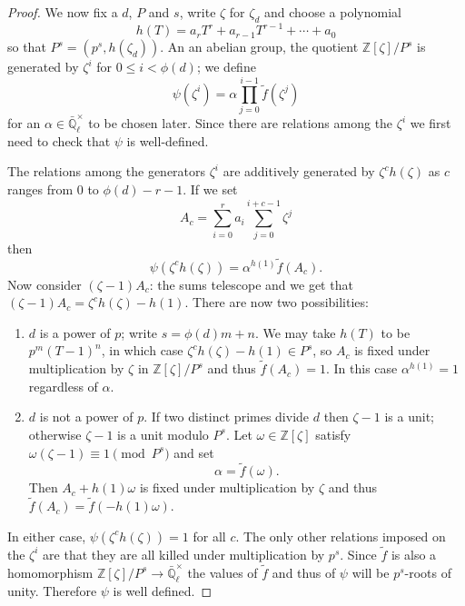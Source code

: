 \documentclass[11pt]{amsart}
\theoremstyle{plain}
\theoremstyle{definition}
\theoremstyle{remark}
\newcommand{\ZZ}{{\mathbb{Z}}}
\newcommand{\EE}{\mathbb{\bar Q}_\ell}
\begin{document}
\begin{proof}
  We now fix a $d$, $P$ and $s$, write $\zeta$ for $\zeta_d$ and
  choose a polynomial
  $$h(T) = a_rT^r + a_{r-1}T^{r-1} + \cdots + a_0$$
  so that $P^s = (p^s, h(\zeta_d))$.
  An an abelian group, the quotient $\ZZ[\zeta] / P^s$ is generated by
  $\zeta^i$ for $0 \le i < \phi(d)$; we define
  \begin{equation} \label{eq:psi-def}
    \psi(\zeta^i) = \alpha \prod_{j=0}^{i-1} \tilde{f}(\zeta^j)
  \end{equation}
  for an $\alpha \in \EE^\times$ to be chosen later.  Since there are
  relations among the $\zeta^i$ we first need to check that $\psi$ is
  well-defined.

  The relations among the generators $\zeta^i$ are additively
  generated by $\zeta^ch(\zeta)$ as $c$ ranges from $0$ to
  $\phi(d)-r-1$.  If we set
  $$A_c = \sum_{i=0}^r a_i \sum_{j=0}^{i+c-1} \zeta^j$$
  then
  $$\psi(\zeta^ch(\zeta)) = \alpha^{h(1)} \tilde{f}(A_c).$$
  Now consider $(\zeta - 1)A_c$: the sums telescope and we get that
  $(\zeta-1)A_c = \zeta^ch(\zeta) - h(1).$ There are now two
  possibilities:
  \begin{enumerate}
  \item $d$ is a power of $p$; write $s = \phi(d)m + n$.  We may take
    $h(T)$ to be $p^m(T-1)^n$, in which case $\zeta^ch(\zeta) - h(1) \in P^s$,
    so $A_c$ is fixed under multiplication by $\zeta$ in
    $\ZZ[\zeta]/P^s$ and thus $\tilde{f}(A_c) = 1$.  In this case
    $\alpha^{h(1)} = 1$ regardless of $\alpha$.
  \item $d$ is not a power of $p$.  If two distinct primes divide $d$
    then $\zeta - 1$ is a unit; otherwise $\zeta - 1$ is a unit modulo
    $P^s$.  Let $\omega \in \ZZ[\zeta]$ satisfy
    $\omega(\zeta - 1) \equiv 1 \pmod{P^s}$ and set
    \begin{equation} \label{alpha-def}
      \alpha = \tilde{f}(\omega).
    \end{equation}
    Then $A_c + h(1)\omega$ is fixed under multiplication by $\zeta$
    and thus $\tilde{f}(A_c) = \tilde{f}(-h(1)\omega)$.
  \end{enumerate}
  In either case, $\psi(\zeta^ch(\zeta)) = 1$ for all $c$.  The only
  other relations imposed on the $\zeta^i$ are that they are all
  killed under multiplication by $p^s$.  Since $\tilde{f}$ is also a
  homomorphism $\ZZ[\zeta]/P^s \rightarrow \EE^\times$ the values of
  $\tilde{f}$ and thus of $\psi$ will be $p^s$-roots of unity.
  Therefore $\psi$ is well defined.


\end{proof}
\end{document}
